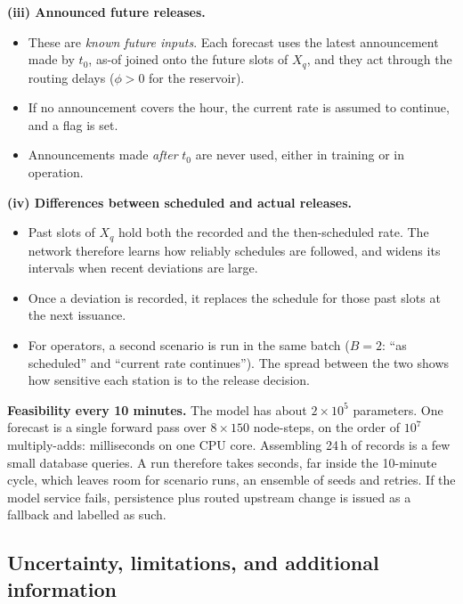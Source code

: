 \textbf{(iii) Announced future releases.}
\begin{itemize}
\item These are \emph{known future inputs}. Each forecast uses the latest announcement made by $t_0$, as-of
joined onto the future slots of $X_q$, and they act through the routing delays ($\phi>0$ for the reservoir).
\item If no announcement covers the hour, the current rate is assumed to continue, and a flag is set.
\item Announcements made \emph{after} $t_0$ are never used, either in training or in operation.
\end{itemize}

\textbf{(iv) Differences between scheduled and actual releases.}
\begin{itemize}
\item Past slots of $X_q$ hold both the recorded and the then-scheduled rate. The network therefore learns how
reliably schedules are followed, and widens its intervals when recent deviations are large.
\item Once a deviation is recorded, it replaces the schedule for those past slots at the next issuance.
\item For operators, a second scenario is run in the same batch ($B=2$: ``as scheduled'' and ``current rate
continues''). The spread between the two shows how sensitive each station is to the release decision.
\end{itemize}

\textbf{Feasibility every 10 minutes.} The model has about $2\times10^5$ parameters. One forecast is a single
forward pass over $8\times150$ node-steps, on the order of $10^7$ multiply-adds: milliseconds on one CPU core.
Assembling 24\,h of records is a few small database queries. A run therefore takes seconds, far inside the
10-minute cycle, which leaves room for scenario runs, an ensemble of seeds and retries. If the model service
fails, persistence plus routed upstream change is issued as a fallback and labelled as such.

\subsection{Uncertainty, limitations, and additional information}

